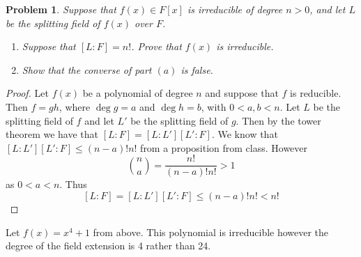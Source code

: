 \documentclass[10pt]{article}
\newcommand{\sk}{\vskip 10mm}
\theoremstyle{plain}
\newtheorem{problem}{Problem}
\theoremstyle{remark}
\begin{document}
\sk

\begin{problem}
  Suppose that $f(x) \in F[x]$ is irreducible of degree $n > 0$,
  and let $L$ be the splitting field of $f(x)$ over $F$.
\begin{enumerate}
    \item Suppose that $[L:F]=n!$. Prove that $f(x)$ is irreducible.
    \item Show that the converse of part $(a)$ is false.
\end{enumerate}
\end{problem}

\begin{proof}
  Let $f(x)$ be a polynomial of degree $n$ and suppose that $f$
  is reducible. Then $f=gh$, where $\deg g=a$ and $\deg h =b$, with
  $0<a,b<n$. Let $L$ be the splitting field of $f$ and let $L'$ be
  the splitting field of $g$. Then by the tower theorem we have
  that $[L:F]=[L:L'][L':F]$. We know that $[L:L'][L':F]\leq (n-a)!n!$
  from a proposition from class. However
  \[ {n\choose a}=\frac{n!}{(n-a)!n!}>1\]
  as $0<a<n$. Thus
  \[[L:F]=[L:L'][L':F]\leq (n-a)!n!< n! \]
\end{proof}

Let $f(x)=x^4+1$ from above. This polynomial is irreducible however
the degree of the field extension is 4 rather than 24.

\end{document}
